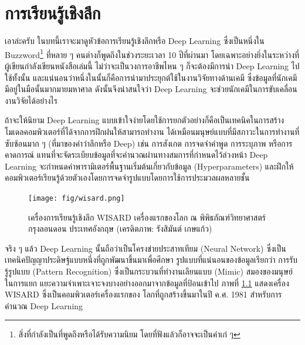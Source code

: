 

\chapter{การเรียนรู้เชิงลึก}
\label{ch:dl}

เอาล่ะครับ ในบทนี้เราจะมาดูหัวข้อการเรียนรู้เชิงลึกหรือ Deep Learning ซึ่งเป็นหนึ่งใน Buzzword\footnote{สิ่งที่กำลังเป็นที่พูดถึงหรือได้รับความนิยม
โดยที่ฟังแล้วก็อาจจะเป็นคำเก๋ ๆ} ที่หลาย ๆ คนต่างก็พูดถึงในช่วงระยะเวลา 10 ปีที่ผ่านมา โดยเฉพาะอย่างยิ่งในระหว่างที่ผู้เขียนกำลังเขียนหนังสือเล่มนี้ 
ไม่ว่าจะเป็นวงการอาชีพไหน ๆ ก็จะต้องมีการนำ Deep Learning ไปใช้ทั้งนั้น และแน่นอนว่าหนึ่งในนั้นก็คือการนำมาประยุกต์ใช้ในงานวิจัยทางด้านเคมี 
ซึ่งข้อมูลที่นักเคมีมีอยู่ในมือนั้นมากมายมหาศาล ดังนั้นจึงน่าสนใจว่า Deep Learning จะช่วยนักเคมีในการขับเคลื่อนงานวิจัยได้อย่างไร

ถ้าจะให้นิยาม Deep Learning แบบเข้าใจง่ายโดยใช้การยกตัวอย่างก็คือเป็นเทคนิคในการสร้างโมเดลคอมพิวเตอร์ที่ได้จากการฝึกฝนให้สามารถทำงาน%
ได้เหมือนมนุษย์แบบที่มีสภาวะในการทำงานที่ซับซ้อนมาก ๆ (ที่มาของคำว่าลึกหรือ Deep) เช่น การสังเกต การจดจำคำพูด การระบุภาพ หรือการคาดการณ์ 
แทนที่จะจัดระเบียบข้อมูลที่จะคำนวณผ่านทางสมการที่กำหนดไว้ล่วงหน้า Deep Learning จะกำหนดค่าพารามิเตอร์พื้นฐานเริ่มต้นเกี่ยวกับข้อมูล 
(Hyperparameters) และฝึกให้คอมพิวเตอร์เรียนรู้ด้วยตัวเองโดยการจดจำรูปแบบโดยการใช้การประมวลผลหลายชั้น

\begin{figure}[H]
    \centering
    \texttt{[image: fig/wisard.png]}
    \caption{เครื่องการเรียนรู้เชิงลึก WISARD เครื่องแรกของโลก ณ พิพิธภัณฑ์วิทยาศาสตร์ กรุงลอนดอน ประเทศอังกฤษ 
    (เครดิตภาพ: รังสิมันต์ เกษแก้ว)}
    \label{fig:wisard}
\end{figure}

จริง ๆ แล้ว Deep Learning นั้นถือว่าเป็นโครงข่ายประสาทเทียม (Neural Network) ซึ่งเป็นเทคนิคปัญญาประดิษฐ์แบบหนึ่งที่ถูกพัฒนาขึ้นมาเพื่อศึกษา%
รูปแบบที่แน่นอนของข้อมูลเรียกว่า การรับรู้รูปแบบ (Pattern Recognition) ซึ่งเป็นกระบวนที่ทำงานเลียนแบบ (Mimic) สมองของมนุษย์ในการแยก%
แยะความจำเพาะเจาะจงบางอย่างออกมาจากข้อมูลที่ป้อนเข้าไป ภาพที่ \ref{fig:wisard} แสดงเครื่อง WISARD ซึ่งเป็นคอมพิวเตอร์เครื่องแรกของ%
โลกที่ถูกสร้างขึ้นมาในปี ค.ศ. 1981 สำหรับการคำนวณ Deep Learning

